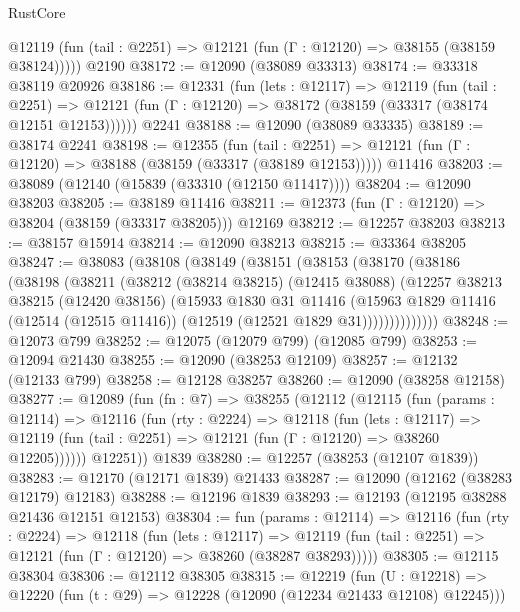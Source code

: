 \begin{lexlean}{RustCore}
\begin{coremodule}
      @12119 (fun (tail : @2251) => @12121 (fun (Γ : @12120) => @38155 (@38159 @38124)))))
    @2190
@38172 := @12090 (@38089 @33313)
@38174 := @33318 @38119 @20926
@38186 := @12331
    (fun (lets : @12117) =>
    @12119
      (fun (tail : @2251) =>
      @12121 (fun (Γ : @12120) => @38172 (@38159 (@33317 (@38174 @12151 @12153))))))
    @2241
@38188 := @12090 (@38089 @33335)
@38189 := @38174 @2241
@38198 := @12355
    (fun (tail : @2251) => @12121 (fun (Γ : @12120) => @38188 (@38159 (@33317 (@38189 @12153)))))
    @11416
@38203 := @38089 (@12140 (@15839 (@33310 (@12150 @11417))))
@38204 := @12090 @38203
@38205 := @38189 @11416
@38211 := @12373 (fun (Γ : @12120) => @38204 (@38159 (@33317 @38205))) @12169
@38212 := @12257 @38203
@38213 := @38157 @15914
@38214 := @12090 @38213
@38215 := @33364 @38205
@38247 := @38083
    (@38108
      (@38149
        (@38151
          (@38153
            (@38170
              (@38186
                (@38198
                  (@38211
                    (@38212
                      (@38214 @38215)
                      (@12415 @38088)
                      (@12257
                        @38213
                        @38215
                        (@12420 @38156)
                        (@15933
                          @1830
                          @31
                          @11416
                          (@15963
                            @1829
                            @11416
                            (@12514 (@12515 @11416))
                            (@12519 (@12521 @1829 @31))))))))))))))
@38248 := @12073 @799
@38252 := @12075 (@12079 @799) (@12085 @799)
@38253 := @12094 @21430
@38255 := @12090 (@38253 @12109)
@38257 := @12132 (@12133 @799)
@38258 := @12128 @38257
@38260 := @12090 (@38258 @12158)
@38277 := @12089
    (fun (fn : @7) =>
    @38255
      (@12112
        (@12115
          (fun (params : @12114) =>
          @12116
            (fun (rty : @2224) =>
            @12118
              (fun (lets : @12117) =>
              @12119 (fun (tail : @2251) => @12121 (fun (Γ : @12120) => @38260 @12205))))))
        @12251))
    @1839
@38280 := @12257 (@38253 (@12107 @1839))
@38283 := @12170 (@12171 @1839) @21433
@38287 := @12090 (@12162 (@38283 @12179) @12183)
@38288 := @12196 @1839
@38293 := @12193 (@12195 @38288 @21436 @12151 @12153)
@38304 := fun (params : @12114) =>
  @12116
    (fun (rty : @2224) =>
    @12118
      (fun (lets : @12117) =>
      @12119 (fun (tail : @2251) => @12121 (fun (Γ : @12120) => @38260 (@38287 @38293)))))
@38305 := @12115 @38304
@38306 := @12112 @38305
@38315 := @12219
    (fun (U : @12218) => @12220 (fun (t : @29) => @12228 (@12090 (@12234 @21433 @12108) @12245)))

\end{coremodule}
\end{lexlean}
